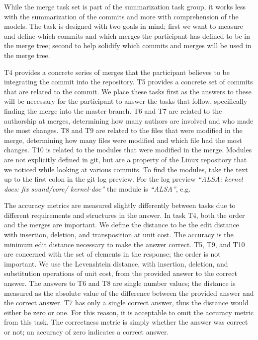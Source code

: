 While the merge task set is part of the summarization task group, it
works less with the summarization of the commits and more with
comprehension of the models. The task is designed with two goals in
mind; first we want to measure and define which commits and which merges
the participant has defined to be in the merge tree; second to help
solidify which commits and merges will be used in the merge tree.

T4 provides a concrete series of merges that the participant believes to
be integrating the commit into the repository. T5 provides a concrete
set of commits that are related to the commit. We place these tasks
first as the answers to these will be necessary for the participant to
answer the tasks that follow, specifically finding the merge into the
master branch. T6 and T7 are related to the authorship at merges,
determining how many authors are involved and who made the most changes.
T8 and T9 are related to the files that were modified in the merge,
determining how many files were modified and which file had the most
changes. T10 is related to the modules that were modified in the merge.
Modules are not explicitly defined in git, but are a property of the
Linux repository that we noticed while looking at various commits. To
find the modules, take the text up to the first colon in the git log
preview. For the log preview \textit{``ALSA: kernel docs: fix
  sound/core/ kernel-doc''} the module is \textit{``ALSA''}, e.g.

The accuracy metrics are measured slightly differently between tasks due
to different requirements and structures in the answer. In task T4, both
the order and the merges are important. We define the distance to be the
edit distance with insertion, deletion, and transposition at unit cost.
The accuracy is the minimum edit distance necessary to make the answer
correct. T5, T9, and T10 are concerned with the set of elements in the
response; the order is not important. We use the Levenshtein distance,
with insertion, deletion, and substitution operations of unit cost, from
the provided answer to the correct answer. The answers to T6 and T8 are
single number values; the distance is measured as the absolute value of
the difference between the provided answer and the correct answer. T7
has only a single correct answer, thus the distance would either be zero
or one. For this reason, it is acceptable to omit the accuracy metric
from this task. The correctness metric is simply whether the answer was
correct or not; an accuracy of zero indicates a correct answer.

